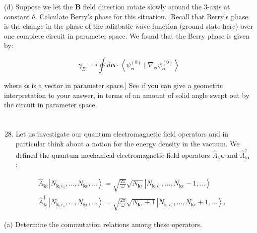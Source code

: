 \documentclass[12pt]{article}
\begin{document}
(d) Suppose we let the $\mathbf{B}$ field direction rotate slowly around the 3-axis at constant $\theta$. Calculate Berry's phase for this situation. [Recall that Berry's phase is the change in the phase of the adiabatic wave function (ground state here) over one complete circuit in parameter space. We found that the Berry phase is given by:


\begin{equation*}
\gamma_{B}=i \oint d \boldsymbol{\alpha} \cdot\left\langle\psi_{\boldsymbol{\alpha}}^{(0)} \mid \nabla_{\boldsymbol{\alpha}} \psi_{\boldsymbol{\alpha}}^{(0)}\right\rangle \tag{4}
\end{equation*}


where $\boldsymbol{\alpha}$ is a vector in parameter space.] See if you can give a geometric interpretation to your answer, in terms of an amount of solid angle swept out by the circuit in parameter space.
\section{}
\begin{enumerate}
  \setcounter{enumi}{27}
  \item Let us investigate our quantum electromagnetic field operators and in particular think about a notion for the energy density in the vacuum. We defined the quantum mechanical electromagnetic field operators $\hat{A}_{\mathrm{k}} \boldsymbol{\epsilon}$ and $\hat{A}_{\mathrm{k} \boldsymbol{\epsilon}}^{\dagger}$ :
\end{enumerate}


\begin{align*}
& \hat{A}_{\mathbf{k} \epsilon}\left|N_{\mathbf{k}_{1} \epsilon_{1}}, \ldots, N_{\mathbf{k} \epsilon}, \ldots\right\rangle=\sqrt{\frac{2 \pi}{\omega}} \sqrt{N_{\mathbf{k} \epsilon}}\left|N_{\mathbf{k}_{1} \epsilon_{1}}, \ldots, N_{\mathbf{k} \epsilon}-1, \ldots\right\rangle  \tag{5}\\
& \hat{A}_{\mathbf{k} \epsilon}^{\dagger}\left|N_{\mathbf{k}_{1} \epsilon_{1}}, \ldots, N_{\mathbf{k} \epsilon}, \ldots\right\rangle=\sqrt{\frac{2 \pi}{\omega}} \sqrt{N_{\mathbf{k} \epsilon}+1}\left|N_{\mathbf{k}_{1} \epsilon_{1}}, \ldots, N_{\mathbf{k} \epsilon}+1, \ldots\right\rangle . \tag{6}
\end{align*}


(a) Determine the commutation relations among these operators.
\end{document}
